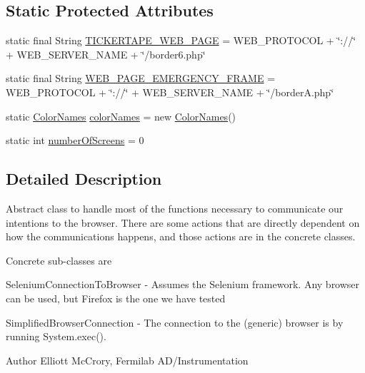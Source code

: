 \subsection*{Static Protected Attributes}
\begin{DoxyCompactItemize}
\item 
static final String \hyperlink{classgov_1_1fnal_1_1ppd_1_1dd_1_1display_1_1client_1_1ConnectionToBrowserInstance_a07f932b29a0bdeb7c0811fd0f815afbb}{T\-I\-C\-K\-E\-R\-T\-A\-P\-E\-\_\-\-W\-E\-B\-\_\-\-P\-A\-G\-E} = W\-E\-B\-\_\-\-P\-R\-O\-T\-O\-C\-O\-L + \char`\"{}\-://\char`\"{} + W\-E\-B\-\_\-\-S\-E\-R\-V\-E\-R\-\_\-\-N\-A\-M\-E + \char`\"{}/border6.\-php\char`\"{}
\item 
static final String \hyperlink{classgov_1_1fnal_1_1ppd_1_1dd_1_1display_1_1client_1_1ConnectionToBrowserInstance_a1081b866c3ae5aa9f6fe831ea3484d2c}{W\-E\-B\-\_\-\-P\-A\-G\-E\-\_\-\-E\-M\-E\-R\-G\-E\-N\-C\-Y\-\_\-\-F\-R\-A\-M\-E} = W\-E\-B\-\_\-\-P\-R\-O\-T\-O\-C\-O\-L + \char`\"{}\-://\char`\"{} + W\-E\-B\-\_\-\-S\-E\-R\-V\-E\-R\-\_\-\-N\-A\-M\-E + \char`\"{}/border\-A.\-php\char`\"{}
\item 
static \hyperlink{classgov_1_1fnal_1_1ppd_1_1dd_1_1util_1_1ColorNames}{Color\-Names} \hyperlink{classgov_1_1fnal_1_1ppd_1_1dd_1_1display_1_1client_1_1ConnectionToBrowserInstance_a519ae3dcdae79f106e41b5d7887c992b}{color\-Names} = new \hyperlink{classgov_1_1fnal_1_1ppd_1_1dd_1_1util_1_1ColorNames}{Color\-Names}()
\item 
static int \hyperlink{classgov_1_1fnal_1_1ppd_1_1dd_1_1display_1_1client_1_1ConnectionToBrowserInstance_a7366adfc07c9163c5f6efcbc0c3985b7}{number\-Of\-Screens} = 0
\end{DoxyCompactItemize}


\subsection{Detailed Description}
Abstract class to handle most of the functions necessary to communicate our intentions to the browser. There are some actions that are directly dependent on how the communications happens, and those actions are in the concrete classes. 

Concrete sub-\/classes are 
\begin{DoxyItemize}
\item Selenium\-Connection\-To\-Browser -\/ Assumes the Selenium framework. Any browser can be used, but Firefox is the one we have tested  
\item Simplified\-Browser\-Connection -\/ The connection to the (generic) browser is by running System.\-exec(). 
\begin{DoxyItemize}
\item 
\end{DoxyItemize}



\begin{DoxyAuthor}{Author}
Elliott Mc\-Crory, Fermilab A\-D/\-Instrumentation 
\end{DoxyAuthor}

\end{DoxyItemize}

